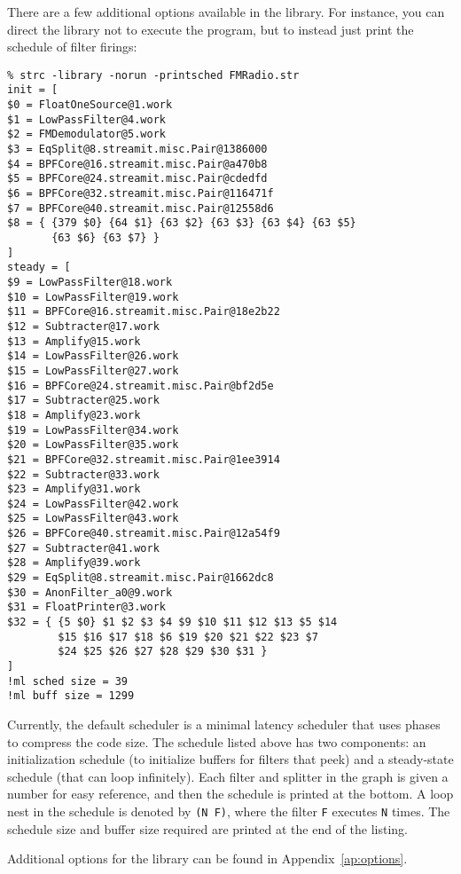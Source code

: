 There are a few additional options available in the library.  For
instance, you can direct the library not to execute the program, but
to instead just print the schedule of filter firings: \enlargethispage{1\baselineskip}
{\small
\begin{verbatim}
% strc -library -norun -printsched FMRadio.str
init = [
$0 = FloatOneSource@1.work
$1 = LowPassFilter@4.work
$2 = FMDemodulator@5.work
$3 = EqSplit@8.streamit.misc.Pair@1386000
$4 = BPFCore@16.streamit.misc.Pair@a470b8
$5 = BPFCore@24.streamit.misc.Pair@cdedfd
$6 = BPFCore@32.streamit.misc.Pair@116471f
$7 = BPFCore@40.streamit.misc.Pair@12558d6
$8 = { {379 $0} {64 $1} {63 $2} {63 $3} {63 $4} {63 $5} 
       {63 $6} {63 $7} }
]
steady = [
$9 = LowPassFilter@18.work
$10 = LowPassFilter@19.work
$11 = BPFCore@16.streamit.misc.Pair@18e2b22
$12 = Subtracter@17.work
$13 = Amplify@15.work
$14 = LowPassFilter@26.work
$15 = LowPassFilter@27.work
$16 = BPFCore@24.streamit.misc.Pair@bf2d5e
$17 = Subtracter@25.work
$18 = Amplify@23.work
$19 = LowPassFilter@34.work
$20 = LowPassFilter@35.work
$21 = BPFCore@32.streamit.misc.Pair@1ee3914
$22 = Subtracter@33.work
$23 = Amplify@31.work
$24 = LowPassFilter@42.work
$25 = LowPassFilter@43.work
$26 = BPFCore@40.streamit.misc.Pair@12a54f9
$27 = Subtracter@41.work
$28 = Amplify@39.work
$29 = EqSplit@8.streamit.misc.Pair@1662dc8
$30 = AnonFilter_a0@9.work
$31 = FloatPrinter@3.work
$32 = { {5 $0} $1 $2 $3 $4 $9 $10 $11 $12 $13 $5 $14 
        $15 $16 $17 $18 $6 $19 $20 $21 $22 $23 $7 
        $24 $25 $26 $27 $28 $29 $30 $31 }
]
!ml sched size = 39
!ml buff size = 1299
\end{verbatim}
} 
%
Currently, the default scheduler is a minimal latency scheduler that
uses phases to compress the code size.  The schedule listed above has
two components: an initialization schedule (to initialize buffers for
filters that peek) and a steady-state schedule (that can loop
infinitely).  Each filter and splitter in the graph is given a number
for easy reference, and then the schedule is printed at the bottom.  A
loop nest in the schedule is denoted by {\tt (N F)}, where the filter
{\tt F} executes {\tt N} times.  The schedule size and buffer size
required are printed at the end of the listing.

Additional options for the library can be found in
Appendix~\ref{ap:options}.

\clearpage
